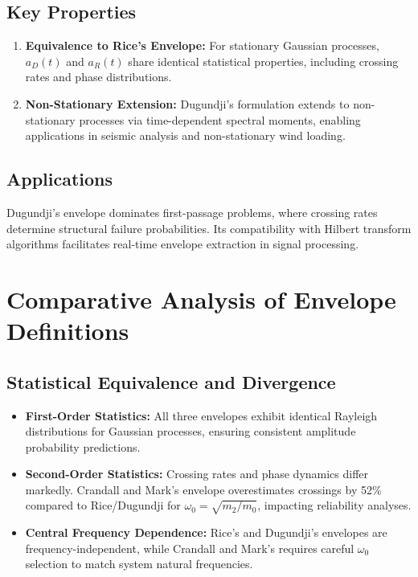 \documentclass[12pt]{article}
\begin{document}
\subsection{Key Properties}
\begin{enumerate}
    \item \textbf{Equivalence to Rice’s Envelope:} For stationary Gaussian processes, $a_D(t)$ and $a_R(t)$ share identical statistical properties, including crossing rates and phase distributions.
    \item \textbf{Non-Stationary Extension:} Dugundji’s formulation extends to non-stationary processes via time-dependent spectral moments, enabling applications in seismic analysis and non-stationary wind loading.
\end{enumerate}

\subsection{Applications}
Dugundji’s envelope dominates first-passage problems, where crossing rates determine structural failure probabilities. Its compatibility with Hilbert transform algorithms facilitates real-time envelope extraction in signal processing.

\section{Comparative Analysis of Envelope Definitions}

\subsection{Statistical Equivalence and Divergence}
\begin{itemize}
    \item \textbf{First-Order Statistics:} All three envelopes exhibit identical Rayleigh distributions for Gaussian processes, ensuring consistent amplitude probability predictions.
    \item \textbf{Second-Order Statistics:} Crossing rates and phase dynamics differ markedly. Crandall and Mark’s envelope overestimates crossings by 52\% compared to Rice/Dugundji for $\omega_0 = \sqrt{m_2/m_0}$, impacting reliability analyses.
    \item \textbf{Central Frequency Dependence:} Rice’s and Dugundji’s envelopes are frequency-independent, while Crandall and Mark’s requires careful $\omega_0$ selection to match system natural frequencies.
\end{itemize}
\end{document}
